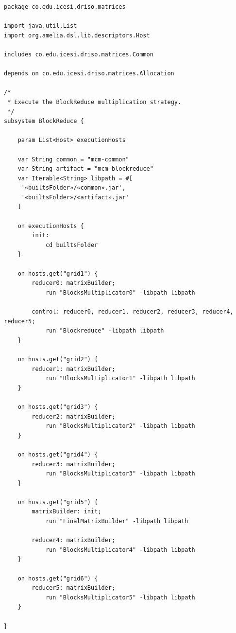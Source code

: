 \documentclass{article}
\begin{document}
\begin{lstlisting}[style=amelia,caption=Subsystem for BlockReduce]
package co.edu.icesi.driso.matrices

import java.util.List
import org.amelia.dsl.lib.descriptors.Host

includes co.edu.icesi.driso.matrices.Common

depends on co.edu.icesi.driso.matrices.Allocation

/*
 * Execute the BlockReduce multiplication strategy.
 */
subsystem BlockReduce {
	
	param List<Host> executionHosts
	
	var String common = "mcm-common"
	var String artifact = "mcm-blockreduce"
	var Iterable<String> libpath = #[
	 '«builtsFolder»/«common».jar',
	 '«builtsFolder»/«artifact».jar'
	]
	
	on executionHosts {
		init:
            cd builtsFolder
	}
	
	on hosts.get("grid1") {
		reducer0: matrixBuilder;
			run "BlocksMultiplicator0" -libpath libpath

		control: reducer0, reducer1, reducer2, reducer3, reducer4, reducer5;
			run "Blockreduce" -libpath libpath
	}
	
	on hosts.get("grid2") {
		reducer1: matrixBuilder;
			run "BlocksMultiplicator1" -libpath libpath
	}
	
	on hosts.get("grid3") {
		reducer2: matrixBuilder;
			run "BlocksMultiplicator2" -libpath libpath
	}
	
	on hosts.get("grid4") {
		reducer3: matrixBuilder;
			run "BlocksMultiplicator3" -libpath libpath
	}
	
	on hosts.get("grid5") {
		matrixBuilder: init;
			run "FinalMatrixBuilder" -libpath libpath
	
		reducer4: matrixBuilder;
			run "BlocksMultiplicator4" -libpath libpath
	}
	
	on hosts.get("grid6") {	
		reducer5: matrixBuilder;
			run "BlocksMultiplicator5" -libpath libpath
	}

}
\end{lstlisting}
\end{document}
